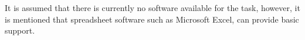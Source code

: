 It is assumed that there is currently no software available for the task, however, it is mentioned that spreadsheet software such as Microsoft Excel, can provide basic support.